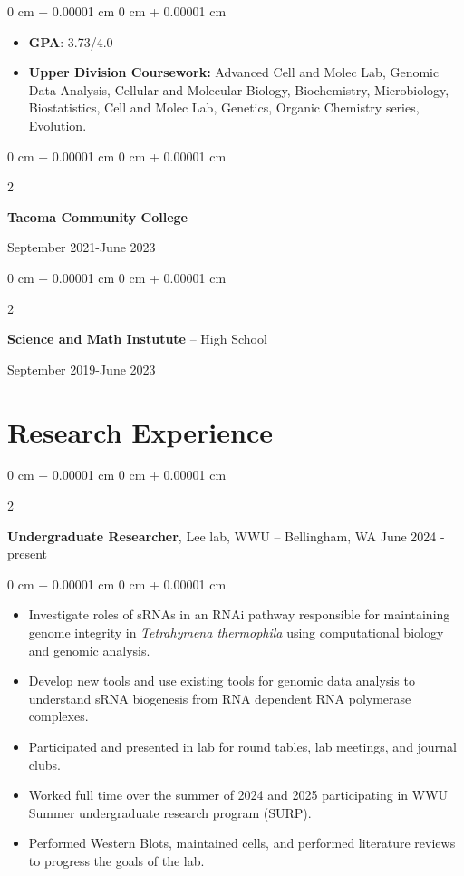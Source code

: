 \documentclass[10pt, article]{article}
\newenvironment{highlights}{
    \begin{itemize}[
        topsep=0.10 cm,
        parsep=0.10 cm,
        partopsep=0pt,
        itemsep=0pt,
        leftmargin=0 cm + 10pt
    ]
}{
    \end{itemize}
} %
\newenvironment{onecolentry}{
    \begin{adjustwidth}{
        0 cm + 0.00001 cm
    }{
        0 cm + 0.00001 cm
    }
}{
    \end{adjustwidth}
} %
\newenvironment{twocolentry}[2][]{
    \onecolentry
    \def\secondColumn{#2}
    \setcolumnwidth{\fill, 4.5 cm}
    \begin{paracol}{2}
}{
    \switchcolumn \raggedleft \secondColumn
    \end{paracol}
    \endonecolentry
} %
\begin{document}
        \vspace{0.10 cm}
        \begin{onecolentry}
            \begin{highlights}
            \item \textbf{GPA}: 3.73/4.0 %
                \item \textbf{Upper Division Coursework:} Advanced Cell and Molec Lab, Genomic Data Analysis, Cellular and Molecular Biology, Biochemistry, Microbiology, Biostatistics, Cell and Molec Lab, Genetics, Organic Chemistry series, Evolution.

            \end{highlights}
        \end{onecolentry}
        \begin{twocolentry}{
            September 2021-June 2023
        }
            \textbf{Tacoma Community College}

        \end{twocolentry}
        \begin{twocolentry}{
            September 2019-June 2023
        }
           \textbf{Science and Math Instutute} -- High School

        \end{twocolentry}




    \section{Research Experience}




        \begin{twocolentry}{
            June 2024 - present
        }
            \textbf{Undergraduate Researcher}, Lee lab, WWU -- Bellingham, WA\end{twocolentry}

        \vspace{0.10 cm}
        \begin{onecolentry}
            \begin{highlights}
            \item Investigate roles of sRNAs in an RNAi pathway responsible for maintaining genome integrity in \textit{Tetrahymena thermophila} using computational biology and genomic analysis.
            \item Develop new tools and use existing tools for genomic data analysis to understand sRNA biogenesis from RNA dependent RNA polymerase complexes.
            \item Participated and presented in lab for round tables, lab meetings, and journal clubs.
            \item Worked full time over the summer of 2024 and 2025 participating in WWU Summer undergraduate research program (SURP).
            \item Performed Western Blots, maintained cells, and performed literature reviews to progress the goals of the lab.
            \end{highlights}
        \end{onecolentry}
\end{document}
